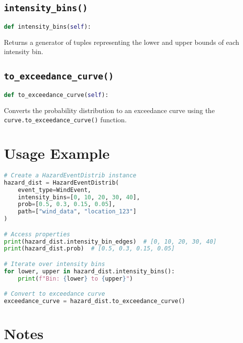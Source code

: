 \documentclass{article}
\begin{document}
\subsection{\texttt{intensity\_bins()}}

\begin{lstlisting}[language=Python]
def intensity_bins(self):
\end{lstlisting}

Returns a generator of tuples representing the lower and upper bounds of each intensity bin.

\subsection{\texttt{to\_exceedance\_curve()}}

\begin{lstlisting}[language=Python]
def to_exceedance_curve(self):
\end{lstlisting}

Converts the probability distribution to an exceedance curve using the \texttt{curve.to\_exceedance\_curve()} function.

\section{Usage Example}

\begin{lstlisting}[language=Python]
# Create a HazardEventDistrib instance
hazard_dist = HazardEventDistrib(
    event_type=WindEvent,
    intensity_bins=[0, 10, 20, 30, 40],
    prob=[0.5, 0.3, 0.15, 0.05],
    path=["wind_data", "location_123"]
)

# Access properties
print(hazard_dist.intensity_bin_edges)  # [0, 10, 20, 30, 40]
print(hazard_dist.prob)  # [0.5, 0.3, 0.15, 0.05]

# Iterate over intensity bins
for lower, upper in hazard_dist.intensity_bins():
    print(f"Bin: {lower} to {upper}")

# Convert to exceedance curve
exceedance_curve = hazard_dist.to_exceedance_curve()
\end{lstlisting}

\section{Notes}
\end{document}
